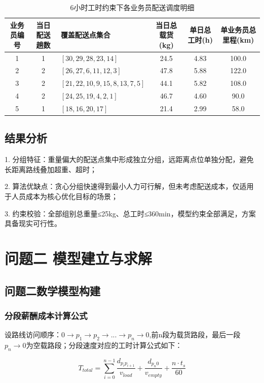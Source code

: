 \documentclass[withoutpreface,bwprint]{cumcmthesis} %
\begin{document}
\begin{table}[htbp]
\centering
\setlength{\tabcolsep}{4pt} %
\footnotesize %
\caption{6小时工时约束下各业务员配送调度明细}
\begin{tabularx}{\textwidth}{c c >{\raggedright\arraybackslash}X c c c}
\toprule
业务员编号 & 当日配送趟数 & 覆盖配送点集合 & 当日总载货(kg) & 单日总工时(h) & 单业务员总里程(km) \\
\midrule
1 & 1 & $[30,29,28,23,14]$ & 24.5 & 4.83 & 100.0 \\
2 & 2 & $[26,27,6,11,12,3]$ & 47.8 & 5.88 & 122.0 \\
3 & 2 & $[21,22,10,9,15,8,13,7,5]$ & 44.1 & 5.82 & 108.0 \\
4 & 2 & $[24,25,19,4,2,1]$ & 46.7 & 4.60 & 90.0 \\
5 & 1 & $[18,16,20,17]$ & 21.4 & 2.99 & 58.0 \\
\bottomrule
\end{tabularx}
\label{tab:6h_schedule}
\end{table}


\subsection{结果分析}
1.	分组特征：重量偏大的配送点集中形成独立分组，远距离点位单独分配，避免长距离路线叠加超重、超时；
\par2.	算法优缺点：贪心分组快速得到最小人力可行解，但未考虑配送成本，仅适用于人员成本为核心优化目标的场景；
\par3.	约束校验：全部组别总重量≤25kg、总工时≤360min，模型约束全部满足，方案具备现实可行性。


\section{问题二 模型建立与求解}
\subsection{ 问题二数学模型构建}
\subsubsection{分段薪酬成本计算公式}
设路线访问顺序：\(0 \to p_1 \to p_2 \to ... \to p_n \to 0\),前n段为载货路段，最后一段\(p_n\to0\)为空载路段；分段速度对应的工时计算公式如下：

\begin{equation}
T_{total}=\sum_{i=0}^{n-1}\frac{d_{p_ip_{i+1}}}{v_{load}}+\frac{d_{p_n0}}{v_{empty}}+\frac{n\cdot t_s}{60}
\label{eq:energy}
\end{equation}
\end{document}
